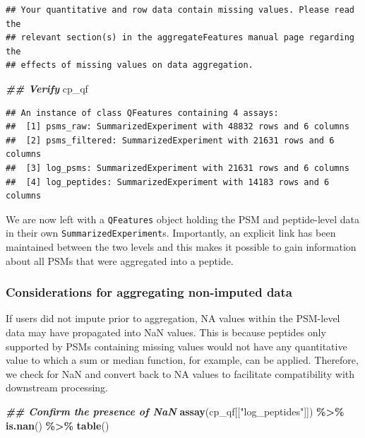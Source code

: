 \documentclass[9pt,a4paper,]{extarticle}
\newenvironment{Shaded}{\begin{snugshade}}{\end{snugshade}}
\newcommand{\DocumentationTok}[1]{\textcolor[rgb]{0.56,0.35,0.01}{\textbf{\textit{#1}}}}
\newcommand{\FunctionTok}[1]{\textcolor[rgb]{0.13,0.29,0.53}{\textbf{#1}}}
\newcommand{\NormalTok}[1]{#1}
\newcommand{\SpecialCharTok}[1]{\textcolor[rgb]{0.81,0.36,0.00}{\textbf{#1}}}
\newcommand{\StringTok}[1]{\textcolor[rgb]{0.31,0.60,0.02}{#1}}
\begin{document}
\begin{verbatim}
## Your quantitative and row data contain missing values. Please read the
## relevant section(s) in the aggregateFeatures manual page regarding the
## effects of missing values on data aggregation.
\end{verbatim}

\begin{Shaded}
\begin{Highlighting}[]
\DocumentationTok{\#\# Verify}
\NormalTok{cp\_qf}
\end{Highlighting}
\end{Shaded}

\begin{verbatim}
## An instance of class QFeatures containing 4 assays:
##  [1] psms_raw: SummarizedExperiment with 48832 rows and 6 columns 
##  [2] psms_filtered: SummarizedExperiment with 21631 rows and 6 columns 
##  [3] log_psms: SummarizedExperiment with 21631 rows and 6 columns 
##  [4] log_peptides: SummarizedExperiment with 14183 rows and 6 columns
\end{verbatim}

We are now left with a \texttt{QFeatures} object holding the PSM and peptide-level data
in their own \texttt{SummarizedExperiment}s. Importantly, an explicit link has been
maintained between the two levels and this makes it possible to gain information
about all PSMs that were aggregated into a peptide.

\subsubsection{Considerations for aggregating non-imputed data}\label{considerations-for-aggregating-non-imputed-data}

If users did not impute prior to aggregation, NA values within the PSM-level
data may have propagated into NaN values. This is because peptides only
supported by PSMs containing missing values would not have any quantitative
value to which a sum or median function, for example, can be applied. Therefore,
we check for NaN and convert back to NA values to facilitate compatibility with
downstream processing.

\begin{Shaded}
\begin{Highlighting}[]
\DocumentationTok{\#\# Confirm the presence of NaN}
\FunctionTok{assay}\NormalTok{(cp\_qf[[}\StringTok{"log\_peptides"}\NormalTok{]]) }\SpecialCharTok{\%\textgreater{}\%}
  \FunctionTok{is.nan}\NormalTok{() }\SpecialCharTok{\%\textgreater{}\%}
  \FunctionTok{table}\NormalTok{()}
\end{Highlighting}
\end{Shaded}
\end{document}
